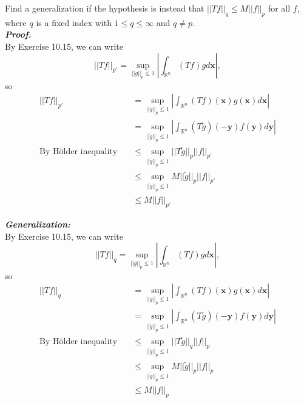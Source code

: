 \documentclass[a4paper,11pt]{article}
\begin{document}
\begin{enumerate}
		Find a generalization if the hypothesis is instead that $||Tf||_q \leq M ||f||_p$ for all $f$, where $q$ is a fixed index with $1 \leq q \leq \infty$ and $q \neq p$.\\
	\newline
	\textit{\textbf {Proof.}}\\
		By Exercise 10.15, we can write
			$$||Tf||_{p'} = \sup_{||g||_p \leq 1} |\int_{\mathbb{R}^n} (Tf) g d\mathbf{x}|,$$
		so
			$$\begin{aligned}
			||Tf||_{p'}
			&= \sup_{||g||_p \leq 1} |\int_{\mathbb{R}^n} (Tf)(\mathbf{x}) g(\mathbf{x}) d\mathbf{x}|\\
			&= \sup_{||\widetilde{g}||_p \leq 1} |\int_{\mathbb{R}^n} (T\widetilde{g})(\mathbf{-y}) f(\mathbf{y}) d\mathbf{y}|\\
			\text{By H\"{o}lder inequality} \quad
			&\leq \sup_{||\widetilde{g}||_p \leq 1} ||T\widetilde{g}||_{p} ||f||_{p'}\\
			&\leq \sup_{||\widetilde{g}||_p \leq 1} M||\widetilde{g}||_{p} ||f||_{p'}\\
			&\leq M ||f||_{p'}
			\end{aligned}$$

		\textit{\textbf {Generalization:}}\\
		By Exercise 10.15, we can write
			$$||Tf||_{q} = \sup_{||g||_p \leq 1} |\int_{\mathbb{R}^n} (Tf) g d\mathbf{x}|,$$
		so
			$$\begin{aligned}
			||Tf||_{q}
			&= \sup_{||g||_p \leq 1} |\int_{\mathbb{R}^n} (Tf)(\mathbf{x}) g(\mathbf{x}) d\mathbf{x}|\\
			&= \sup_{||\widetilde{g}||_p \leq 1} |\int_{\mathbb{R}^n} (T\widetilde{g})(\mathbf{-y}) f(\mathbf{y}) d\mathbf{y}|\\
			\text{By H\"{o}lder inequality} \quad
			&\leq \sup_{||\widetilde{g}||_p \leq 1} ||T\widetilde{g}||_{q} ||f||_{p}\\
			&\leq \sup_{||\widetilde{g}||_p \leq 1} M||\widetilde{g}||_{p} ||f||_{p}\\
			&\leq M ||f||_{p}
			\end{aligned}$$


\end{enumerate}
\end{document}
